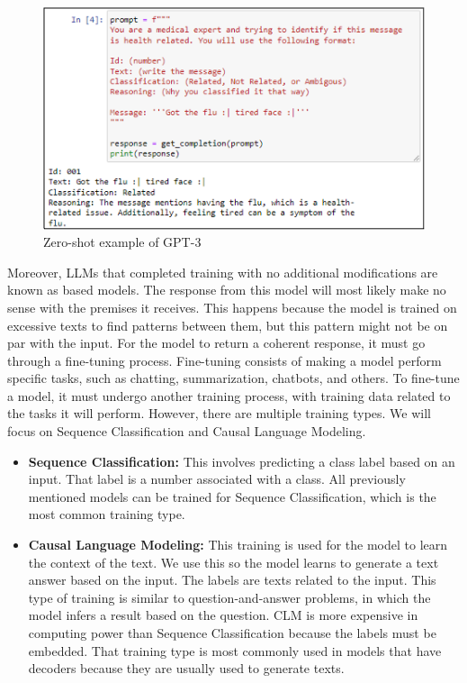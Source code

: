  \begin{figure}[!h]
    \centering
        \includegraphics[width=0.9\linewidth]{images/gpt_example.png}
        \caption{Zero-shot example of GPT-3}
        \label{gpt_example}
\end{figure}


Moreover, LLMs that completed training with no additional modifications are known as based models. The response from this model will most likely make no sense with the premises it receives. This happens because the model is trained on excessive texts to find patterns between them, but this pattern might not be on par with the input. For the model to return a coherent response, it must go through a fine-tuning process. Fine-tuning consists of making a model perform specific tasks, such as chatting, summarization, chatbots, and others. To fine-tune a model, it must undergo another training process, with training data related to the tasks it will perform. However, there are multiple training types. We will focus on Sequence Classification and Causal Language Modeling.

\begin{itemize}
\item{\textbf{Sequence Classification:}} This involves predicting a class label based on an input. That label is a number associated with a class. All previously mentioned models can be trained for Sequence Classification, which is the most common training type.

\item{\textbf{Causal Language Modeling:}} This training is used for the model to learn the context of the text. We use this so the model learns to generate a text answer based on the input. The labels are texts related to the input. This type of training is similar to question-and-answer problems, in which the model infers a result based on the question. CLM is more expensive in computing power than Sequence Classification because  the labels must be embedded. That training type is most commonly used in models that have decoders because they are usually used to generate texts.

\end{itemize}

